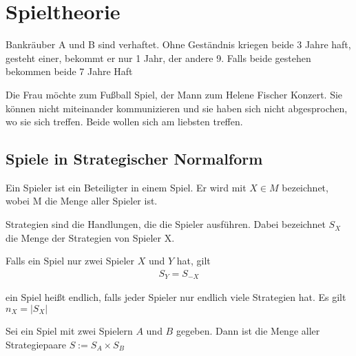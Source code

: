 
\chapter{Spieltheorie}
\label{chap:spieltheorie}

\begin{bsp}[Gefangenendilemma]
	Bankräuber A und B sind verhaftet. Ohne Geständnis kriegen beide 3 Jahre haft, gesteht einer, bekommt er nur 1 Jahr, der andere 9. Falls beide gestehen bekommen beide 7 Jahre Haft
\end{bsp}

\begin{bsp}[Geschlechterkampf]
	Die Frau möchte zum Fußball Spiel, der Mann zum Helene Fischer Konzert. Sie können nicht miteinander kommunizieren und sie haben sich nicht abgesprochen, wo sie sich treffen. Beide wollen sich am liebsten treffen. 
\end{bsp}

\section{Spiele in Strategischer Normalform}

\begin{defi}[Spieler]
	Ein Spieler ist ein Beteiligter in einem Spiel. Er wird mit $X \in M$ bezeichnet, wobei M die Menge aller Spieler ist.  
\end{defi}

\begin{defi}[Strategie]
	Strategien sind die Handlungen, die die Spieler ausführen. Dabei bezeichnet $S_X$ die Menge der Strategien von Spieler X. 
\end{defi}

\begin{thm}
	Falls ein Spiel nur zwei Spieler $X$ und $Y$ hat, gilt 
	\begin{align*}
		S_Y=S_{-X}
	\end{align*}
\end{thm}

\begin{defi}
	ein Spiel heißt endlich, falls jeder Spieler nur endlich viele Strategien hat. Es gilt $n_X=|S_X|$ 
\end{defi}

\begin{defi}
	Sei ein Spiel mit zwei Spielern $A$ und $B$ gegeben. Dann ist die Menge aller Strategiepaare $S:=S_A \times S_B$  
\end{defi}

